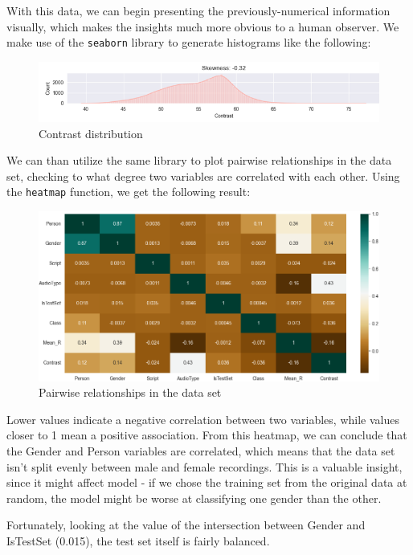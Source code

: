 \documentclass[11pt, letterpaper]{article}
\begin{document}
With this data, we can begin presenting the previously-numerical information visually, which makes the insights much more obvious to a human observer. We make use of the \verb|seaborn| library to generate histograms like the following:

\begin{figure}[H]
    \centering
    \includegraphics[width=1\linewidth]{image.png}
    \caption{Contrast distribution}
    \label{fig:enter-label}
\end{figure}

We can than utilize the same library to plot pairwise relationships in the data set, checking to what degree two variables are correlated with each other. Using the \verb|heatmap| function, we get the following result:

\begin{figure}[H]
    \centering
    \includegraphics[width=1\linewidth]{pairplot.png}
    \caption{Pairwise relationships in the data set}
    \label{fig:enter-label}
\end{figure}

Lower values indicate a negative correlation between two variables, while values closer to 1 mean a positive association. From this heatmap, we can conclude that the Gender and Person variables are correlated, which means that the data set isn't split evenly between male and female recordings. This is a valuable insight, since it might affect model - if we chose the training set from the original data at random, the model might be worse at classifying one gender than the other.

Fortunately, looking at the value of the intersection between Gender and IsTestSet (0.015), the test set itself is fairly balanced.
\end{document}
